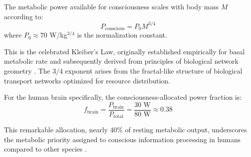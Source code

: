 \begin{theorem}
\label{thm:kleiber}
The metabolic power available for consciousness scales with body mass $M$ according to:
\begin{equation}
P_{\text{conscious}} = P_0 M^{3/4}
\label{eq:kleiber}
\end{equation}
where $P_0 \approx 70$ W/kg$^{3/4}$ is the normalization constant.
\end{theorem}

This is the celebrated Kleiber's Law, originally established empirically for basal metabolic rate \citep{kleiber1947body} and subsequently derived from principles of biological network geometry \citep{west1997general}. The $3/4$ exponent arises from the fractal-like structure of biological transport networks optimized for resource distribution.

For the human brain specifically, the consciousness-allocated power fraction is:
\begin{equation}
f_{\text{brain}} = \frac{P_{\text{brain}}}{P_{\text{total}}} = \frac{30 \text{ W}}{80 \text{ W}} \approx 0.38
\end{equation}

This remarkable allocation, nearly 40\% of resting metabolic output, underscores the metabolic priority assigned to conscious information processing in humans compared to other species \citep{mink1981ratio,herculano2011remarkable}.

